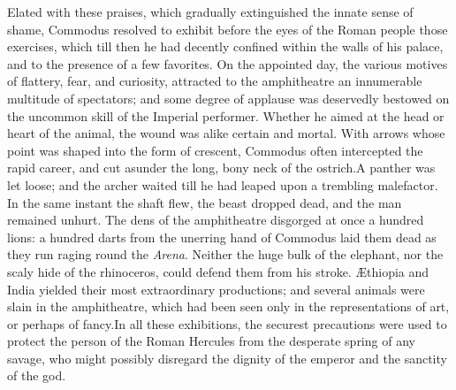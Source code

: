 
Elated with these praises, which gradually extinguished the
innate sense of shame, Commodus resolved to exhibit before the
eyes of the Roman people those exercises, which till then he had
decently confined within the walls of his palace, and to the
presence of a few favorites. On the appointed day, the various
motives of flattery, fear, and curiosity, attracted to the
amphitheatre an innumerable multitude of spectators; and some
degree of applause was deservedly bestowed on the uncommon skill
of the Imperial performer. Whether he aimed at the head or heart
of the animal, the wound was alike certain and mortal. With
arrows whose point was shaped into the form of crescent, Commodus
often intercepted the rapid career, and cut asunder the long,
bony neck of the ostrich.\footnotemark[33] A panther was let loose; and the
archer waited till he had leaped upon a trembling malefactor. In
the same instant the shaft flew, the beast dropped dead, and the
man remained unhurt. The dens of the amphitheatre disgorged at
once a hundred lions: a hundred darts from the unerring hand of
Commodus laid them dead as they run raging round the \textit{Arena}.
Neither the huge bulk of the elephant, nor the scaly hide of the
rhinoceros, could defend them from his stroke. Æthiopia and India
yielded their most extraordinary productions; and several animals
were slain in the amphitheatre, which had been seen only in the
representations of art, or perhaps of fancy.\footnotemark[34] In all these
exhibitions, the securest precautions were used to protect the
person of the Roman Hercules from the desperate spring of any
savage, who might possibly disregard the dignity of the emperor
and the sanctity of the god.\footnotemark[35]



